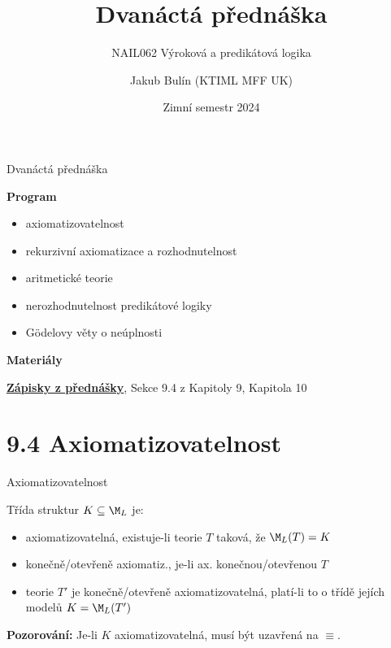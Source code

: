 \documentclass{beamer}
\title{Dvanáctá přednáška}
\subtitle{NAIL062 Výroková a predikátová logika}
\author{Jakub Bulín (KTIML MFF UK)}
\date{Zimní semestr 2024}
\begin{document}
\maketitle


\begin{frame}{Dvanáctá přednáška}

    \textbf{Program}
        \begin{itemize}            
            \item axiomatizovatelnost
            \item rekurzivní axiomatizace a rozhodnutelnost
            \item aritmetické teorie
            \item nerozhodnutelnost predikátové logiky
            \item Gödelovy věty o neúplnosti
        \end{itemize}

    \textbf{Materiály}

        \href{https://github.com/jbulin-mff-uk/nail062/raw/main/lecture/lecture-notes/lecture-notes.pdf}{\alert{\textbf{Zápisky z přednášky}}}, Sekce 9.4 z Kapitoly 9, Kapitola 10

\end{frame}


\section{9.4 Axiomatizovatelnost}


\begin{frame}{Axiomatizovatelnost}
    
    \pause
    Třída struktur $K\subseteq\M_L$ je:
    
    \pause
    \begin{itemize}
        \item \alert{axiomatizovatelná}, existuje-li teorie $T$ taková, že $\M_L(T)=K$\pause
        \item \alert{konečně}/\alert{otevřeně} axiomatiz., je-li ax. konečnou/otevřenou $T$\pause
        \item teorie $T'$ je \alert{konečně}/\alert{otevřeně} axiomatizovatelná, platí-li to o třídě jejích modelů $K=\M_L(T')$
    \end{itemize}

    \pause
    \textbf{Pozorování:} Je-li $K$ axiomatizovatelná, musí být uzavřená na $\equiv$.

    \medskip
    
    \pause

\end{frame}
\end{document}
